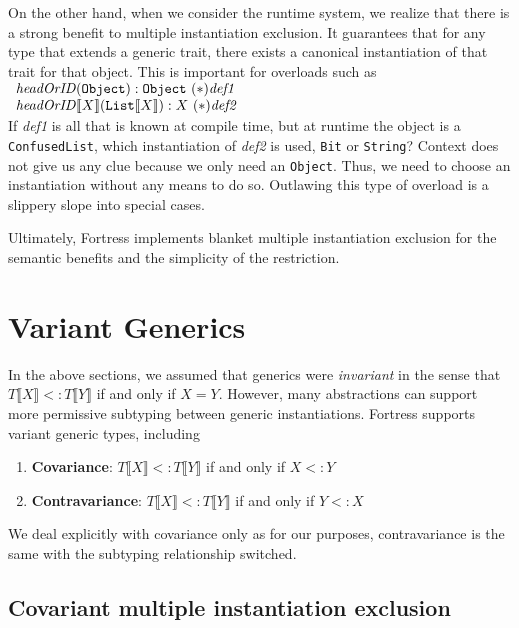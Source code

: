 \documentclass[preprint]{sigplanconf}
\newcommand{\ob}[1]{\ensuremath{\llbracket {#1} \rrbracket}}
\begin{document}
On the other hand, when we consider the runtime system, we realize that there is a strong
benefit to multiple instantiation exclusion.  It guarantees that for any type that extends a generic
trait, there exists a canonical instantiation of that trait for that object.  This is important for
overloads such as\\

$\begin{array}{l}
{\it headOrID}({\tt Object}) : {\tt Object}~(*){\it def1}\\
{\it headOrID}\ob{X}({\tt List}\ob{X}) : X~(*){\it def2}\\
\end{array}$\\

If {\it def1} is all that is known at compile time, but at runtime the object is a 
{\tt ConfusedList}, which instantiation of {\it def2} is used, {\tt Bit} or {\tt String}?
Context does not give us any clue because we only need an {\tt Object}.  Thus,
we need to choose an instantiation without any means to do so.  Outlawing this
type of overload is a slippery slope into special cases.

Ultimately, Fortress implements blanket multiple instantiation exclusion for the semantic
benefits and the simplicity of the restriction.

\section{Variant Generics}

In the above sections, we assumed that generics were {\it invariant} in the sense that $T\ob{X} <: T\ob{Y}$ if and only if $X = Y$.  However,
many abstractions can support more permissive subtyping between generic instantiations.   Fortress
supports variant generic types, including

\begin{enumerate}
\item {\bf Covariance}: $T\ob{X} <: T\ob{Y}$ if and only if $X <: Y$
\item {\bf Contravariance}: $T\ob{X} <: T\ob{Y}$ if and only if $Y <: X$
\end{enumerate}

We deal explicitly with covariance only as for our purposes, contravariance is the same with the subtyping relationship switched.

\subsection{Covariant multiple instantiation exclusion}
\end{document}
